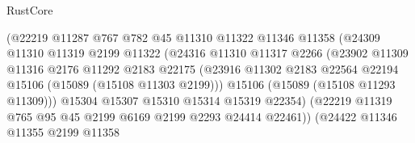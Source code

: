 \begin{lexlean}{RustCore}
\begin{coremodule}
                                  (@22219
                                    @11287
                                    @767
                                    @782
                                    @45
                                    @11310
                                    @11322
                                    @11346
                                    @11358
                                    (@24309
                                      @11310
                                      @11319
                                      @2199
                                      @11322
                                      (@24316
                                        @11310
                                        @11317
                                        @2266
                                        (@23902
                                          @11309
                                          @11316
                                          @2176
                                          @11292
                                          @2183
                                          @22175
                                          (@23916
                                            @11302
                                            @2183
                                            @22564
                                            @22194
                                            @15106
                                            (@15089 (@15108 @11303 @2199)))
                                          @15106
                                          (@15089 (@15108 @11293 @11309)))
                                        @15304
                                        @15307
                                        @15310
                                        @15314
                                        @15319
                                        @22354)
                                      (@22219
                                        @11319
                                        @765
                                        @95
                                        @45
                                        @2199
                                        @6169
                                        @2199
                                        @2293
                                        @24414
                                        @22461))
                                    (@24422
                                      @11346
                                      @11355
                                      @2199
                                      @11358

\end{coremodule}
\end{lexlean}
